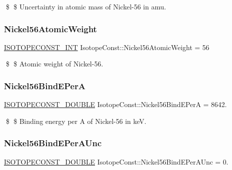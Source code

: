 \$ \$ Uncertainty in atomic mass of Nickel-\/56 in amu. \mbox{\label{group___isotope_const-_nickel-_ni56_ga3a33952c46ecfea0c2b22a1b23b4dcc3}} 
\subsubsection{\texorpdfstring{Nickel56\+Atomic\+Weight}{Nickel56AtomicWeight}}
{\footnotesize\ttfamily \mbox{\hyperlink{group___isotope_const-_macros_ga5f18360b3e99483a35c32d789e62621c}{I\+S\+O\+T\+O\+P\+E\+C\+O\+N\+S\+T\+\_\+\+I\+NT}} Isotope\+Const\+::\+Nickel56\+Atomic\+Weight = 56}

\$ \$ Atomic weight of Nickel-\/56. \mbox{\label{group___isotope_const-_nickel-_ni56_ga0a8b79f1c56e3e5294df1b661a0cea37}} 
\subsubsection{\texorpdfstring{Nickel56\+Bind\+E\+PerA}{Nickel56BindEPerA}}
{\footnotesize\ttfamily \mbox{\hyperlink{group___isotope_const-_macros_ga8f45a7272ce02c0b4c65c44636ed719a}{I\+S\+O\+T\+O\+P\+E\+C\+O\+N\+S\+T\+\_\+\+D\+O\+U\+B\+LE}} Isotope\+Const\+::\+Nickel56\+Bind\+E\+PerA = 8642.}

\$ \$ Binding energy per A of Nickel-\/56 in keV. \mbox{\label{group___isotope_const-_nickel-_ni56_ga825df14d9cfb407a1baaf60d994a18b3}} 
\subsubsection{\texorpdfstring{Nickel56\+Bind\+E\+Per\+A\+Unc}{Nickel56BindEPerAUnc}}
{\footnotesize\ttfamily \mbox{\hyperlink{group___isotope_const-_macros_ga8f45a7272ce02c0b4c65c44636ed719a}{I\+S\+O\+T\+O\+P\+E\+C\+O\+N\+S\+T\+\_\+\+D\+O\+U\+B\+LE}} Isotope\+Const\+::\+Nickel56\+Bind\+E\+Per\+A\+Unc = 0.}

